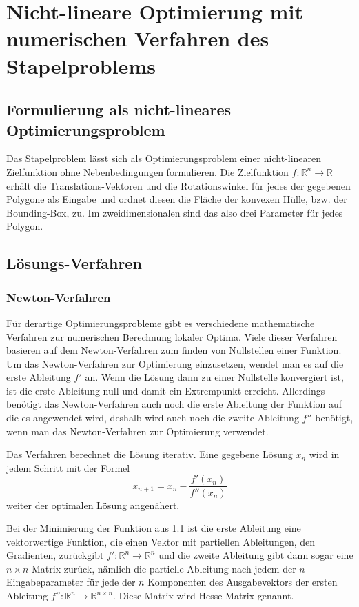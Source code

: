 \documentclass[runningheads,a4paper]{llncs}
\begin{document}
\section{Nicht-lineare Optimierung mit numerischen Verfahren des Stapelproblems}

\subsection{Formulierung als nicht-lineares Optimierungsproblem}
\label{formObjStacking}
Das Stapelproblem lässt sich als Optimierungsproblem einer nicht-linearen Zielfunktion ohne Nebenbedingungen formulieren. Die Zielfunktion ${f: \mathbb{R}^n \rightarrow \mathbb{R}}$ erhält die Translations-Vektoren und die Rotationswinkel für jedes der gegebenen Polygone als Eingabe und ordnet diesen die Fläche der konvexen Hülle, bzw. der Bounding-Box, zu. Im zweidimensionalen sind das also drei Parameter für jedes Polygon.

\subsection{Lösungs-Verfahren}
\label{sec:uncon_nonlin_opt}

\subsubsection{Newton-Verfahren}

Für derartige Optimierungsprobleme gibt es verschiedene mathematische Verfahren zur numerischen Berechnung lokaler Optima. Viele dieser Verfahren basieren auf dem Newton-Verfahren zum finden von Nullstellen einer Funktion. Um das Newton-Verfahren zur Optimierung einzusetzen, wendet man es auf die erste Ableitung $f'$ an. Wenn die Lösung dann zu einer Nullstelle konvergiert ist, ist die erste Ableitung null und damit ein Extrempunkt erreicht. Allerdings benötigt das Newton-Verfahren auch noch die erste Ableitung der Funktion auf die es angewendet wird, deshalb wird auch noch die zweite Ableitung $f''$ benötigt, wenn man das Newton-Verfahren zur Optimierung verwendet.

Das Verfahren berechnet die Lösung iterativ. Eine gegebene Lösung $x_n$ wird in jedem Schritt mit der Formel
\begin{equation*}
x_{n+1} = x_n - \frac{f'(x_n)}{f''(x_n)}
\end{equation*}
weiter der optimalen Lösung angenähert.

Bei der Minimierung der Funktion aus \ref{formObjStacking} ist die erste Ableitung eine vektorwertige Funktion, die einen Vektor mit partiellen Ableitungen, den Gradienten, zurückgibt ${f': \mathbb{R}^n \rightarrow \mathbb{R}^n}$ und die zweite Ableitung gibt dann sogar eine ${n\times n}$-Matrix zurück, nämlich die partielle Ableitung nach jedem der $n$ Eingabeparameter für jede der $n$ Komponenten des Ausgabevektors der ersten Ableitung ${f'': \mathbb{R}^n \rightarrow \mathbb{R}^{n\times n}}$. Diese Matrix wird Hesse-Matrix genannt.
\end{document}

